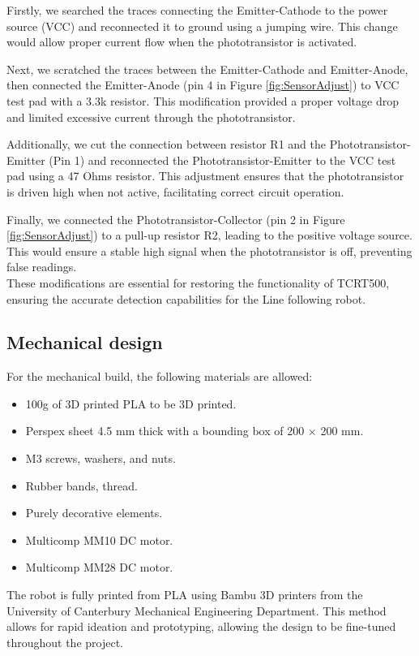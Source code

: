 \documentclass{article}
\begin{document}
Firstly, we searched the traces connecting the Emitter-Cathode to the power source (VCC) and reconnected it to ground using a jumping wire. This change would allow proper current flow when the phototransistor is activated. 

Next, we scratched the traces between the Emitter-Cathode and Emitter-Anode, then connected the Emitter-Anode (pin 4 in Figure \ref{fig:SensorAdjust}) to VCC test pad with a 3.3k resistor. This modification provided a proper voltage drop and limited excessive current through the phototransistor. 

Additionally, we cut the connection between resistor R1 and the Phototransistor-Emitter (Pin 1) and reconnected the Phototransistor-Emitter to the VCC test pad using a 47 Ohms resistor. This adjustment ensures that the phototransistor is driven high when not active, facilitating correct circuit operation.  

Finally, we connected the Phototransistor-Collector (pin 2 in Figure \ref{fig:SensorAdjust}) to a pull-up resistor R2, leading to the positive voltage source. This would ensure a stable high signal when the phototransistor is off, preventing false readings.  
\\

These modifications are essential for restoring the functionality of TCRT500, ensuring the accurate detection capabilities for the Line following robot. 

\subsection{Mechanical design}
For the mechanical build, the following materials are allowed: 

\begin{itemize}  
    \item 100g of 3D printed PLA to be 3D printed.   
    \item Perspex sheet 4.5 mm thick with a bounding box of 200 × 200 mm.   
    \item M3 screws, washers, and nuts. 
    \item Rubber bands, thread. 
    \item Purely decorative elements. 
    \item Multicomp MM10 DC motor.
    \item Multicomp MM28 DC motor.
\end{itemize}  
The robot is fully printed from PLA using Bambu 3D printers from the University of Canterbury Mechanical Engineering Department. This method allows for rapid ideation and prototyping, allowing the design to be fine-tuned throughout the project.  
\end{document}
